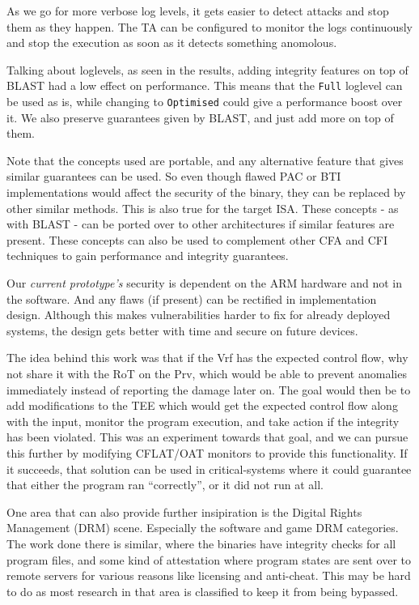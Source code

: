 \documentclass[a4paper, nobind]{templates/ociamthesis}
\begin{document}
As we go for more verbose log levels, it gets easier to detect attacks and stop
them as they happen. The TA can be configured to monitor the logs continuously
and stop the execution as soon as it detects something anomolous.

Talking about loglevels, as seen in the results, adding integrity features on top
of BLAST had a low effect on performance. This means that the \texttt{Full} loglevel
can be used as is, while changing to \texttt{Optimised} could give a performance boost over it.
We also preserve guarantees given by BLAST, and just add more on top of them.

Note that the concepts used are portable, and any alternative feature that gives
similar guarantees can be used. So even though flawed PAC or BTI implementations
would affect the security of the binary, they can be replaced by other similar methods.
This is also true for the target ISA. These concepts - as with BLAST - can be ported
over to other architectures if similar features are present. These concepts can also
be used to complement other CFA and CFI techniques to gain performance and integrity guarantees.

Our \emph{current prototype's} security is dependent on the ARM hardware and not in the software.
And any flaws (if present) can be rectified in implementation design. Although this makes
vulnerabilities harder to fix for already deployed systems, the design gets better
with time and secure on future devices.

The idea behind this work was that if the Vrf has the expected control flow, why
not share it with the RoT on the Prv, which would be able to prevent anomalies
immediately instead of reporting the damage later on.
The goal would then be to add modifications to the TEE which would get the expected
control flow along with the input, monitor the program execution, and take action
if the integrity has been violated. This was an experiment towards that goal, and we can
pursue this further by modifying CFLAT/OAT monitors to provide this functionality.
If it succeeds, that solution can be used in critical-systems where it could
guarantee that either the program ran ``correctly'', or it did not run at all.

One area that can also provide further insipiration is the Digital Rights Management
(DRM) scene. Especially the software and game DRM categories. The work done there
is similar, where the binaries have integrity checks for all program files, and
some kind of attestation where program states are sent over to remote servers
for various reasons like licensing and anti-cheat. This may be hard to do as most
research in that area is classified to keep it from being bypassed.
\end{document}
